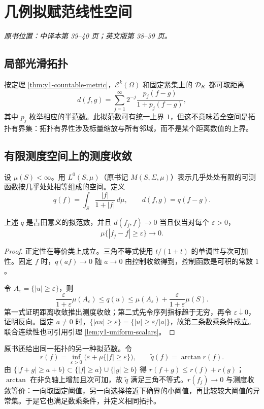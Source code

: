 \section{几例拟赋范线性空间}\label{sec:yosida-01-04}
\noindent\textit{原书位置：中译本第 39--40 页；英文版第 38--39 页。}

\subsection{局部光滑拓扑}
按定理 \ref{thm:y1-countable-metric}，$\mathcal E^k(\Omega)$ 和固定紧集上的 $\mathcal{D}_K$ 都可取距离
\[
 d(f,g)=\sum_{j=1}^\infty2^{-j}\frac{p_j(f-g)}{1+p_j(f-g)},
\]
其中 $p_j$ 枚举相应的半范数。此拟范数可有统一上界 $1$，但这不意味着全空间是拓扑有界集：拓扑有界性涉及标量缩放与所有邻域，而不是某个距离数值的上界。

\subsection{有限测度空间上的测度收敛}
\begin{definition}[可测函数空间]
设 $\mu(S)<\infty$。用 $L^0(S,\mu)$（原书记 $M(S,\Sigma,\mu)$）表示几乎处处有限的可测函数按几乎处处相等组成的空间。定义
\[
 q(f)=\int_S\frac{|f|}{1+|f|}\,d\mu,\qquad d(f,g)=q(f-g).
\]
\end{definition}
\begin{proposition}[积分距离与测度收敛]\label{prop:y1-measure-convergence}
上述 $q$ 是吉田意义的拟范数，并且 $d(f_j,f)\to0$ 当且仅当对每个 $\varepsilon>0$，
\[
 \mu\{|f_j-f|\ge\varepsilon\}\longrightarrow0.
\]
\end{proposition}
\begin{proof}
正定性在等价类上成立。三角不等式使用 $t/(1+t)$ 的单调性与次可加性。固定 $f$ 时，$q(af)\to0$ 随 $a\to0$ 由控制收敛得到，控制函数是可积的常数 $1$。

令 $A_\varepsilon=\{|u|\ge\varepsilon\}$，则
\[
 \frac{\varepsilon}{1+\varepsilon}\mu(A_\varepsilon)
 \le q(u)\le\mu(A_\varepsilon)
 +\frac{\varepsilon}{1+\varepsilon}\mu(S).
\]
第一式证明距离收敛推出测度收敛；第二式先令序列指标趋于无穷，再令 $\varepsilon\downarrow0$，证明反向。固定 $a\ne0$ 时，$\{|au|\ge\varepsilon\}=\{|u|\ge\varepsilon/|a|\}$，故第二条数乘条件成立。联合连续性也可引用引理 \ref{lem:y1-uniform-scalars}。
\end{proof}
原书还给出同一拓扑的另一种拟范数。令
\[
 r(f)=\inf_{\varepsilon>0}\bigl(\varepsilon+\mu\{|f|\ge\varepsilon\}\bigr),
 \qquad \widetilde q(f)=\arctan r(f).
\]
由 $\{|f+g|\ge a+b\}\subset\{|f|\ge a\}\cup\{|g|\ge b\}$ 得 $r(f+g)\le r(f)+r(g)$；$\arctan$ 在非负轴上增加且次可加，故 $\widetilde q$ 满足三角不等式。$r(f_j)\to0$ 与测度收敛等价：一向取固定阈值，另一向选择接近下确界的小阈值，再比较较大阈值的异常集。于是它也满足数乘条件，并定义相同拓扑。

